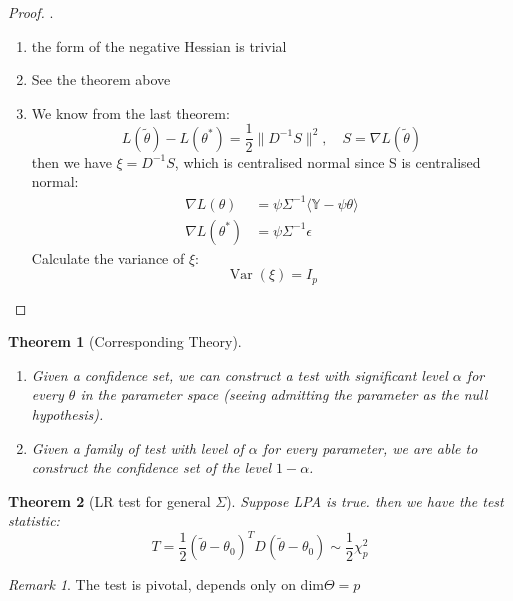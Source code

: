 \documentclass[a4paper,12pt, oneside, fleqn]{book}
\newtheorem{theorem}{Theorem}[section]
\theoremstyle{definition}
\theoremstyle{remark}
\newtheorem*{remark}{Remark}
\DeclareMathOperator{\var}{Var}
\begin{document}
\begin{proof}.
	\begin{enumerate}
		\item the form of the negative Hessian is trivial
		\item See the theorem above
		\item We know from the last theorem:
			\begin{equation*}
				L(\tilde{\theta}) - L(\theta^*) = \frac{1}{2} \| D^{-1} S \|^{2}, \quad S = \nabla L(\tilde{\theta})
			\end{equation*}
			then we have $\xi = D^{-1} S$, which is centralised normal since S is centralised normal:
			\begin{align*}
				\nabla L(\theta) &= \psi \Sigma^{-1} \langle \mathbb{Y} - \psi \theta \rangle \\
				\nabla L(\theta^*) &= \psi \Sigma^{-1} \epsilon 
			\end{align*}
			Calculate the variance of $\xi$:
			\begin{equation*}
				\var(\xi) = I_p
			\end{equation*}
	\end{enumerate}
\end{proof}

\begin{theorem}[Corresponding Theory]
\begin{enumerate}
    \item Given a confidence set, we can construct a test with significant level $\alpha$ for every $\theta$ in the parameter space (seeing admitting the parameter as the null hypothesis).
    \item Given a family of test with level of $\alpha$ for every parameter, we are able to construct the confidence set of the level $1 - \alpha$. 
\end{enumerate}
\end{theorem}


\begin{theorem}[LR test for general $\Sigma$]
	Suppose LPA is true. then we have the test statistic:
	\begin{equation*}
		T = \frac{1}{2} (\tilde{\theta} - \theta_0)^T D (\tilde{\theta} - \theta_0) \sim \frac{1}{2} \chi_p^2
	\end{equation*}
\end{theorem}
\begin{remark}
The test is pivotal, depends only on dim$\Theta = p$	
\end{remark}
\end{document}
